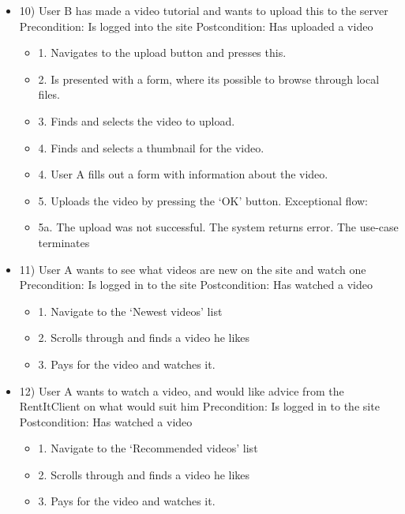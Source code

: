\begin{itemize}
\item 10)
User B has made a video tutorial and wants to upload this to the server
\newline Precondition: Is logged into the site
\newline Postcondition: Has uploaded a video
\begin{itemize}
    \item 1. Navigates to the upload button and presses this.
    \item 2. Is presented with a form, where its possible to browse through local files.
    \item 3. Finds and selects the video to upload.
    \item 4. Finds and selects a thumbnail for the video.
    \item 4. User A fills out a form with information about the video.
    \item 5. Uploads the video by pressing the ‘OK’ button. 
\newline Exceptional flow:
    \item 5a. The upload was not successful. The system returns error. The use-case terminates
\end{itemize}

\item 11)
User A wants to see what videos are new on the site and watch one
\newline Precondition: Is logged in to the site
\newline Postcondition: Has watched a video
\begin{itemize}
    \item 1. Navigate to the ‘Newest videos’ list
    \item 2. Scrolls through and finds a video he likes
    \item 3. Pays for the video and watches it.
\end{itemize}

\item 12) 
User A wants to watch a video, and would like advice from the RentItClient on what would suit him
\newline Precondition: Is logged in to the site
\newline Postcondition: Has watched a video
\begin{itemize}
    \item 1. Navigate to the ‘Recommended videos’ list
    \item 2. Scrolls through and finds a video he likes
    \item 3. Pays for the video and watches it.
\end{itemize}


\end{itemize}
